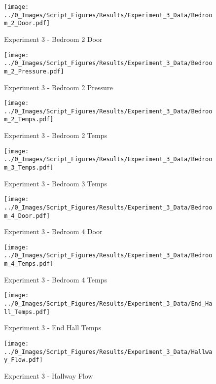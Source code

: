 	\clearpage

	\begin{figure}[H]
		\centering
		\texttt{[image: ../0\_Images/Script\_Figures/Results/Experiment\_3\_Data/Bedroom\_2\_Door.pdf]}
		\caption[]{Experiment 3 - Bedroom 2 Door}
	\end{figure}
 

	\begin{figure}[H]
		\centering
		\texttt{[image: ../0\_Images/Script\_Figures/Results/Experiment\_3\_Data/Bedroom\_2\_Pressure.pdf]}
		\caption[]{Experiment 3 - Bedroom 2 Pressure}
	\end{figure}
 
	\clearpage

	\begin{figure}[H]
		\centering
		\texttt{[image: ../0\_Images/Script\_Figures/Results/Experiment\_3\_Data/Bedroom\_2\_Temps.pdf]}
		\caption[]{Experiment 3 - Bedroom 2 Temps}
	\end{figure}
 

	\begin{figure}[H]
		\centering
		\texttt{[image: ../0\_Images/Script\_Figures/Results/Experiment\_3\_Data/Bedroom\_3\_Temps.pdf]}
		\caption[]{Experiment 3 - Bedroom 3 Temps}
	\end{figure}
 
	\clearpage

	\begin{figure}[H]
		\centering
		\texttt{[image: ../0\_Images/Script\_Figures/Results/Experiment\_3\_Data/Bedroom\_4\_Door.pdf]}
		\caption[]{Experiment 3 - Bedroom 4 Door}
	\end{figure}
 

	\begin{figure}[H]
		\centering
		\texttt{[image: ../0\_Images/Script\_Figures/Results/Experiment\_3\_Data/Bedroom\_4\_Temps.pdf]}
		\caption[]{Experiment 3 - Bedroom 4 Temps}
	\end{figure}
 
	\clearpage

	\begin{figure}[H]
		\centering
		\texttt{[image: ../0\_Images/Script\_Figures/Results/Experiment\_3\_Data/End\_Hall\_Temps.pdf]}
		\caption[]{Experiment 3 - End Hall Temps}
	\end{figure}
 

	\begin{figure}[H]
		\centering
		\texttt{[image: ../0\_Images/Script\_Figures/Results/Experiment\_3\_Data/Hallway\_Flow.pdf]}
		\caption[]{Experiment 3 - Hallway Flow}
	\end{figure}
 
